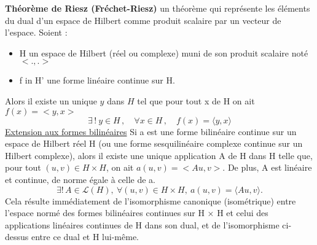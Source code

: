 \documentclass{article}
\begin{document}
\textbf{Th\'eor\`eme de Riesz (Fr\'echet-Riesz)}\newline
un th\'eor\`eme qui repr\'esente les \'el\'ements du dual d'un espace de Hilbert comme produit scalaire par un vecteur de l'espace.
Soient :
\begin{itemize}
	\item H un espace de Hilbert (r\'eel ou complexe) muni de son produit scalaire not\'e $<.,.>$
	\item f in H' une forme lin\'eaire continue sur H.
\end{itemize}
Alors il existe un unique $y$ dans $H$ tel que pour tout x de H on ait $f(x) = <y, x>$
$$
\exists\,!\ y \in H\,, \quad \forall x\in H\,, \quad f(x) = \langle y,x\rangle
$$
\underline{Extension aux formes bilin\'eaires}\newline
Si a est une forme bilin\'eaire continue sur un espace de Hilbert r\'eel H (ou une forme sesquilin\'eaire complexe continue sur un Hilbert complexe), alors il existe une unique application A de H dans H telle que, pour tout $(u, v) \in H \times H$, on ait $a(u, v) = <Au, v>$. De plus, A est lin\'eaire et continue, de norme \'egale \`a celle de a.
$$
\exists !\,A\in\mathcal{L}(H),\ \forall (u,v)\in H\times H,\ a(u,v)=\langle Au,v \rangle.
$$
Cela r\'esulte imm\'ediatement de l'isomorphisme canonique (isom\'etrique) entre l'espace norm\'e des formes bilin\'eaires continues sur H × H et celui des applications lin\'eaires continues de H dans son dual, et de l'isomorphisme ci-dessus entre ce dual et H lui-m\^eme.
\bigskip
\end{document}
